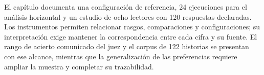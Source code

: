 El capítulo documenta una configuración de referencia, 24 ejecuciones para el análisis horizontal y
un estudio de ocho lectores con 120 respuestas declaradas. Los instrumentos permiten relacionar
rasgos, comparaciones y configuraciones; su interpretación exige mantener la correspondencia entre
cada cifra y su fuente. El rango de acierto comunicado del juez y el corpus de 122 historias se
presentan con ese alcance, mientras que la generalización de las preferencias requiere ampliar la
muestra y completar su trazabilidad.
